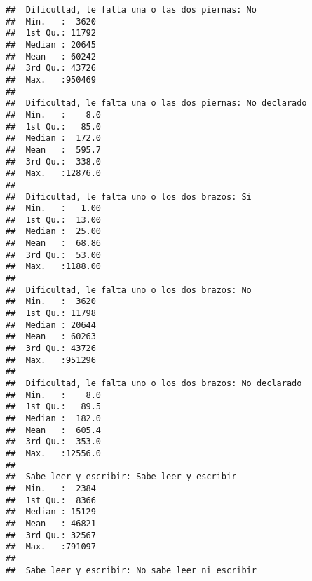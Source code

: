 \documentclass[11pt,]{article}
\begin{document}
\begin{verbatim}
##  Dificultad, le falta una o las dos piernas: No
##  Min.   :  3620                                
##  1st Qu.: 11792                                
##  Median : 20645                                
##  Mean   : 60242                                
##  3rd Qu.: 43726                                
##  Max.   :950469                                
##                                                
##  Dificultad, le falta una o las dos piernas: No declarado
##  Min.   :    8.0                                         
##  1st Qu.:   85.0                                         
##  Median :  172.0                                         
##  Mean   :  595.7                                         
##  3rd Qu.:  338.0                                         
##  Max.   :12876.0                                         
##                                                          
##  Dificultad, le falta uno o los dos brazos: Si
##  Min.   :   1.00                              
##  1st Qu.:  13.00                              
##  Median :  25.00                              
##  Mean   :  68.86                              
##  3rd Qu.:  53.00                              
##  Max.   :1188.00                              
##                                               
##  Dificultad, le falta uno o los dos brazos: No
##  Min.   :  3620                               
##  1st Qu.: 11798                               
##  Median : 20644                               
##  Mean   : 60263                               
##  3rd Qu.: 43726                               
##  Max.   :951296                               
##                                               
##  Dificultad, le falta uno o los dos brazos: No declarado
##  Min.   :    8.0                                        
##  1st Qu.:   89.5                                        
##  Median :  182.0                                        
##  Mean   :  605.4                                        
##  3rd Qu.:  353.0                                        
##  Max.   :12556.0                                        
##                                                         
##  Sabe leer y escribir: Sabe leer y escribir
##  Min.   :  2384                            
##  1st Qu.:  8366                            
##  Median : 15129                            
##  Mean   : 46821                            
##  3rd Qu.: 32567                            
##  Max.   :791097                            
##                                            
##  Sabe leer y escribir: No sabe leer ni escribir

\end{verbatim}
\end{document}
